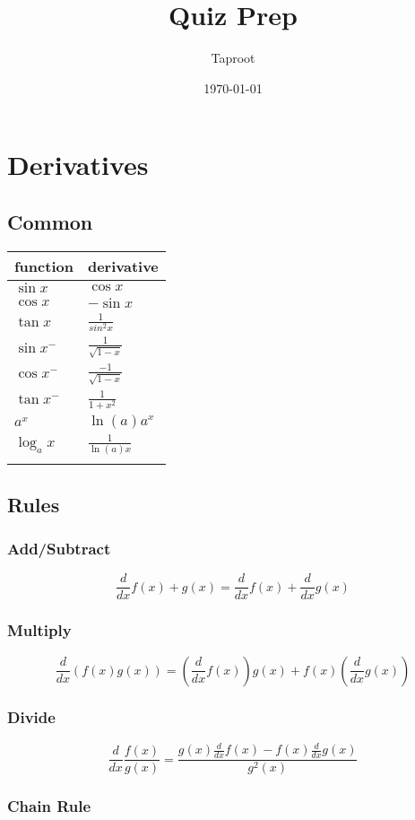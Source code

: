 \documentclass[letterpaper]{article}
\author{Taproot}
\date{\today}
\title{Quiz Prep}
\renewcommand{\tableofcontents}{}
\begin{document}
\tableofcontents

\section{Derivatives}
\label{sec:orgcd5b403}
\subsection{Common}
\label{sec:orgdaaa9cc}
\begin{center}
\begin{tabular}{ll}
function & derivative\\
\hline
\(\sin x\) & \(\cos x\)\\
\(\cos x\) & \(-\sin x\)\\
\(\tan x\) & \(\frac{1}{sin^2 x}\)\\
\(\sin x^-\) & \(\frac{1}{\sqrt{1-x}}\)\\
\(\cos x^-\) & \(\frac{-1}{\sqrt{1-x}}\)\\
\(\tan x^-\) & \(\frac{1}{1+x^2}\)\\
\hline
\(a^x\) & \(\ln(a) a^x\)\\
\(\log_a x\) & \(\frac{1}{\ln(a) x}\)\\
 & \\
\end{tabular}
\end{center}


\subsection{Rules}
\label{sec:org88e16f1}
\subsubsection{Add/Subtract}
\label{sec:orgbe46b7a}
\[ \frac{d}{dx} f(x) + g(x) = \frac{d}{dx} f(x) + \frac{d}{dx} g(x) \]
\subsubsection{Multiply}
\label{sec:org74ca249}
\[ \frac{d}{dx} \left(f(x) g(x)\right) = \left(\frac{d}{dx} f(x)\right) g(x) + f(x)\left( \frac{d}{dx}g(x)\right) \]
\subsubsection{Divide}
\label{sec:orgf35a90a}
\[ \frac{d}{dx} \frac{f(x)}{g(x)} = \frac{g(x)\frac{d}{dx}f(x) - f(x) \frac{d}{dx} g(x) }{g^2(x)} \]
\subsubsection{Chain Rule}
\label{sec:org8b54c2d}
\end{document}
